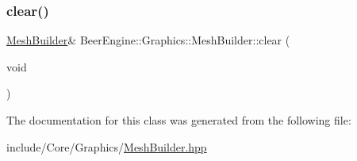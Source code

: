 \subsubsection{\texorpdfstring{clear()}{clear()}}
{\footnotesize\ttfamily \mbox{\hyperlink{class_beer_engine_1_1_graphics_1_1_mesh_builder}{Mesh\+Builder}}\& Beer\+Engine\+::\+Graphics\+::\+Mesh\+Builder\+::clear (\begin{DoxyParamCaption}\item[{void}]{ }\end{DoxyParamCaption})}



The documentation for this class was generated from the following file\+:\begin{DoxyCompactItemize}
\item 
include/\+Core/\+Graphics/\mbox{\hyperlink{_mesh_builder_8hpp}{Mesh\+Builder.\+hpp}}\end{DoxyCompactItemize}

